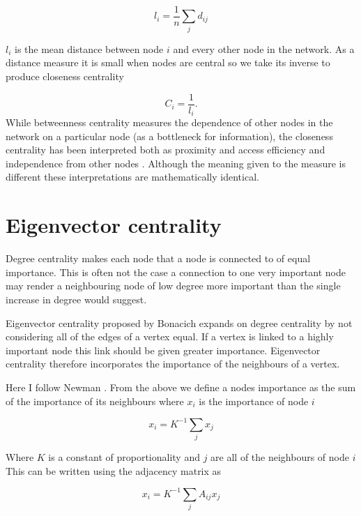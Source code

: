 \begin{equation}
    l_i = \frac{1}{n} \sum_j d_{ij}
\end{equation}

$l_i$ is the mean distance between node $i$ and every other node in the network. As a distance measure it is small when nodes are central so we take its inverse to produce closeness centrality


\begin{equation}
    C_i = \frac{1}{l_i}. 
\end{equation}
\cite{newman2018networks}
While betweenness centrality measures the dependence of other nodes in the network on a particular node (as a bottleneck for information), the closeness centrality has been interpreted both as proximity and access efficiency and independence from other nodes . Although the meaning given to the measure is different these interpretations are mathematically identical.



\section{Eigenvector centrality}
Degree centrality makes each node that a node is connected to of equal importance. This is often not the case a connection to one very important node may render a neighbouring node of low degree more important than the single increase in degree would suggest. 

Eigenvector centrality proposed by Bonacich \cite{bonacich1972factoring} expands on degree centrality by not considering all of the edges of a vertex equal. If a vertex is linked to a highly important node this link should be given greater importance. Eigenvector centrality therefore incorporates the importance of the neighbours of a vertex.

Here I follow Newman \cite{newman2018networks}. From the above we define a nodes importance as the sum of the importance of its neighbours where $x_i$ is the importance of node $i$

\begin{equation}
    x_i = K^{-1} \sum_j x_j
\end{equation}

Where $K$ is a constant of proportionality and $j$ are all of the neighbours of node $i$ This can be written using the adjacency matrix as

\begin{equation}
    x_i = K^{-1} \sum_j A_{ij} x_j
\end{equation}

